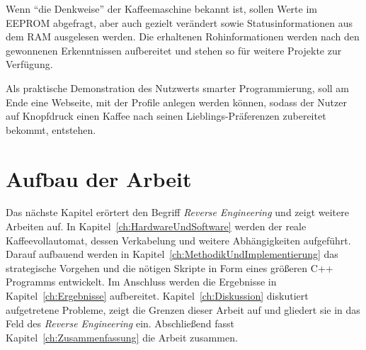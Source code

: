 Wenn "`die Denkweise"' der Kaffeemaschine bekannt ist, sollen Werte im \ac{EEPROM} abgefragt, aber auch gezielt verändert sowie Statusinformationen aus dem \ac{RAM} ausgelesen werden.
Die erhaltenen Rohinformationen werden nach den gewonnenen Erkenntnissen aufbereitet und stehen so für weitere Projekte zur Verfügung.

Als praktische Demonstration des Nutzwerts smarter Programmierung, soll am Ende eine Webseite, mit der Profile anlegen werden können, sodass der Nutzer auf Knopfdruck einen Kaffee nach seinen Lieblings-Präferenzen zubereitet bekommt, entstehen.

\section{Aufbau der Arbeit}
Das nächste Kapitel erörtert den Begriff \textit{Reverse Engineering} und zeigt weitere Arbeiten auf.
In Kapitel~\ref{ch:HardwareUndSoftware} werden der reale Kaffeevollautomat, dessen Verkabelung und weitere Abhängigkeiten aufgeführt.
Darauf aufbauend werden in Kapitel~\ref{ch:MethodikUndImplementierung} das strategische Vorgehen und die nötigen Skripte in Form eines größeren C++ Programms entwickelt.
Im Anschluss werden die Ergebnisse in Kapitel~\ref{ch:Ergebnisse} aufbereitet.
Kapitel~\ref{ch:Diskussion} diskutiert aufgetretene Probleme, zeigt die Grenzen dieser Arbeit auf und gliedert sie in das Feld des \textit{Reverse Engineering} ein.
Abschließend fasst Kapitel~\ref{ch:Zusammenfassung} die Arbeit zusammen.
